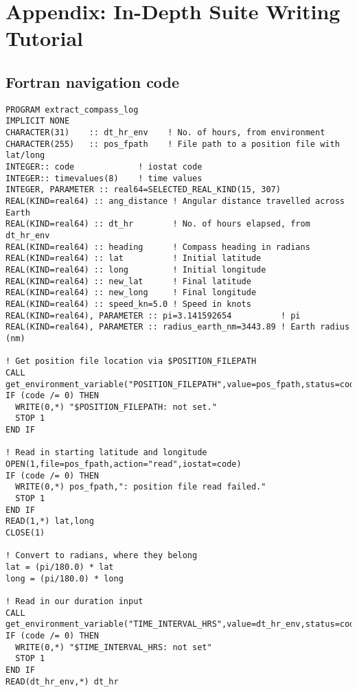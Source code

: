 \section{Appendix: In-Depth Suite Writing Tutorial}
\label{Appendix In-Depth Suite Writing Tutorial}


\subsection{Fortran navigation code}

\lstset{language=Fortran}
\begin{lstlisting}[columns=fullflexible,basicstyle=\small]
PROGRAM extract_compass_log
IMPLICIT NONE
CHARACTER(31)    :: dt_hr_env    ! No. of hours, from environment
CHARACTER(255)   :: pos_fpath    ! File path to a position file with lat/long
INTEGER:: code             ! iostat code
INTEGER:: timevalues(8)    ! time values
INTEGER, PARAMETER :: real64=SELECTED_REAL_KIND(15, 307)
REAL(KIND=real64) :: ang_distance ! Angular distance travelled across Earth
REAL(KIND=real64) :: dt_hr        ! No. of hours elapsed, from dt_hr_env
REAL(KIND=real64) :: heading      ! Compass heading in radians
REAL(KIND=real64) :: lat          ! Initial latitude
REAL(KIND=real64) :: long         ! Initial longitude
REAL(KIND=real64) :: new_lat      ! Final latitude
REAL(KIND=real64) :: new_long     ! Final longitude
REAL(KIND=real64) :: speed_kn=5.0 ! Speed in knots
REAL(KIND=real64), PARAMETER :: pi=3.141592654          ! pi
REAL(KIND=real64), PARAMETER :: radius_earth_nm=3443.89 ! Earth radius (nm)

! Get position file location via $POSITION_FILEPATH
CALL get_environment_variable("POSITION_FILEPATH",value=pos_fpath,status=code)
IF (code /= 0) THEN
  WRITE(0,*) "$POSITION_FILEPATH: not set."
  STOP 1
END IF

! Read in starting latitude and longitude
OPEN(1,file=pos_fpath,action="read",iostat=code)
IF (code /= 0) THEN
  WRITE(0,*) pos_fpath,": position file read failed."
  STOP 1
END IF
READ(1,*) lat,long
CLOSE(1)

! Convert to radians, where they belong
lat = (pi/180.0) * lat
long = (pi/180.0) * long

! Read in our duration input
CALL get_environment_variable("TIME_INTERVAL_HRS",value=dt_hr_env,status=code)
IF (code /= 0) THEN
  WRITE(0,*) "$TIME_INTERVAL_HRS: not set"
  STOP 1
END IF
READ(dt_hr_env,*) dt_hr


\end{lstlisting}
